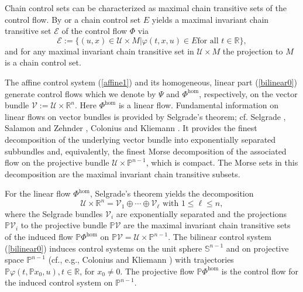 \documentclass[preprint,12pt]{elsarticle}
\begin{document}
Chain control sets can be characterized as maximal chain transitive sets of
the control flow. By \cite[Theorem 4.3.11]{ColK00} or \cite[Proposition
1.24(iv)]{Kawa13} a chain control set $E$ yields a maximal invariant chain
transitive set $\mathcal{E}$ of the control flow $\Phi$ via
\begin{equation}
\mathcal{E}:=\{(u,x)\in\mathcal{U}\times M\left\vert \varphi(t,x,u)\in
E\mbox{
			for all }t\in\mathbb{R}\right.  \}, \label{chain_transitive1}%
\end{equation}
and for any maximal invariant chain transitive set in $\mathcal{U}\times M$
the projection to $M$ is a chain control set.

The affine control system (\ref{affine1}) and its homogeneous, linear part
(\ref{bilinear0}) generate control flows which we denote by $\Psi$ and
$\Phi^{\hom}$, respectively, on the vector bundle $\mathcal{V}:=\mathcal{U}%
\times\mathbb{R}^{n}$. Here $\Phi^{\hom}$ is a linear flow. Fundamental
information on linear flows on vector bundles is provided by Selgrade's
theorem; cf. Selgrade \cite{Selg75}, Salamon and Zehnder \cite{SalZ88},
Colonius and Kliemann \cite{ColK00, ColK14}. It provides the finest
decomposition of the underlying vector bundle into exponentially separated
subbundles and, equivalently, the finest Morse decomposition of the associated
flow on the projective bundle $\mathcal{U}\times\mathbb{P}^{n-1}$, which is
compact. The Morse sets in this decomposition are the maximal invariant chain
transitive subsets.

For the linear flow $\Phi^{\hom}$, Selgrade's theorem yields the decomposition%
\begin{equation}
\mathcal{U}\times\mathbb{R}^{n}=\mathcal{V}_{1}\oplus\cdots\oplus
\mathcal{V}_{\ell}\text{ with }1\leq\ell\leq n, \label{Sel_hom}%
\end{equation}
where the Selgrade bundles $\mathcal{V}_{i}$ are exponentially separated and
the projections $\mathbb{P}\mathcal{V}_{i}$ to the projective bundle
$\mathbb{P}\mathcal{V}$ are the maximal invariant chain transitive sets of the
induced flow $\mathbb{P}\Phi^{\hom}$ on $\mathbb{P}\mathcal{V}=\mathcal{U}%
\times\mathbb{P}^{n-1}$. The bilinear control system (\ref{bilinear0}) induces
control systems on the unit sphere $\mathbb{S}^{n-1}$ and on projective space
$\mathbb{P}^{n-1}$ (cf., e.g., Colonius and Kliemann \cite[Chapter 6]{ColK00})
with trajectories $\mathbb{P}\varphi(t,\mathbb{P}x_{0},u),t\in\mathbb{R}$, for
$x_{0}\not =0$. The projective flow $\mathbb{P}\Phi^{\hom}$ is the control
flow for the induced control system on $\mathbb{P}^{n-1}$.
\end{document}
